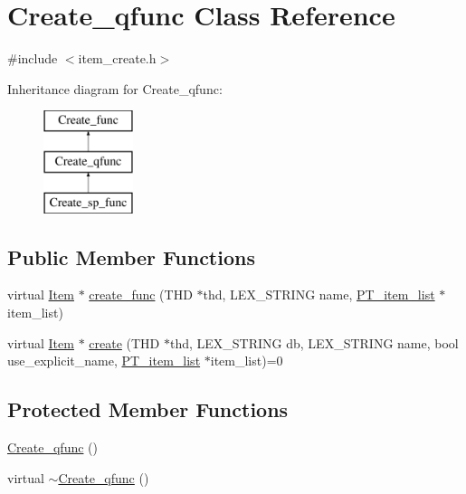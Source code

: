 \hypertarget{classCreate__qfunc}{}\section{Create\+\_\+qfunc Class Reference}
\label{classCreate__qfunc}


{\ttfamily \#include $<$item\+\_\+create.\+h$>$}

Inheritance diagram for Create\+\_\+qfunc\+:\begin{figure}[H]
\begin{center}
\leavevmode
\includegraphics[height=3.000000cm]{classCreate__qfunc}
\end{center}
\end{figure}
\subsection*{Public Member Functions}
\begin{DoxyCompactItemize}
\item 
virtual \mbox{\hyperlink{classItem}{Item}} $\ast$ \mbox{\hyperlink{classCreate__qfunc_a25b2d459957d202dfbc28d08674d1816}{create\+\_\+func}} (T\+HD $\ast$thd, L\+E\+X\+\_\+\+S\+T\+R\+I\+NG name, \mbox{\hyperlink{classPT__item__list}{P\+T\+\_\+item\+\_\+list}} $\ast$item\+\_\+list)
\item 
virtual \mbox{\hyperlink{classItem}{Item}} $\ast$ \mbox{\hyperlink{classCreate__qfunc_a8d6874ea57598603b833b89e70c139d0}{create}} (T\+HD $\ast$thd, L\+E\+X\+\_\+\+S\+T\+R\+I\+NG db, L\+E\+X\+\_\+\+S\+T\+R\+I\+NG name, bool use\+\_\+explicit\+\_\+name, \mbox{\hyperlink{classPT__item__list}{P\+T\+\_\+item\+\_\+list}} $\ast$item\+\_\+list)=0
\end{DoxyCompactItemize}
\subsection*{Protected Member Functions}
\begin{DoxyCompactItemize}
\item 
\mbox{\hyperlink{classCreate__qfunc_adccfcbb49b8ba1bbc05a1cfd4943681e}{Create\+\_\+qfunc}} ()
\item 
virtual \mbox{\hyperlink{classCreate__qfunc_a26a42634953058108c887134bd90aa04}{$\sim$\+Create\+\_\+qfunc}} ()
\end{DoxyCompactItemize}


